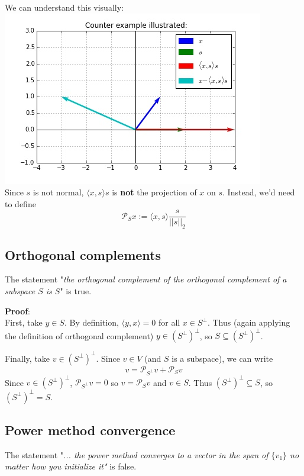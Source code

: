 \documentclass[paper=a4, fontsize=11pt]{scrartcl} %
\numberwithin{equation}{section} %
\numberwithin{figure}{section} %
\numberwithin{table}{section} %
\begin{document}
We can understand this visually:\\
\includegraphics[scale = 1]{q1_a.jpg}\\
Since $s$ is not normal, $\langle x , s \rangle s$ is \textbf{not} the projection of $x$ on $s$. Instead, we'd need to define
\[ \mathcal{P}_S x := \langle x, s \rangle \frac{s}{||s||_2}\]

\subsection{Orthogonal complements}

The statement "\emph{the orthogonal complement of the orthogonal complement of a subspace $S$ is $S$}" is true.

\textbf{Proof}:\\
First, take $y \in S$. By definition, $\langle y, x \rangle = 0$ for all $x \in S^\bot$. Thus (again applying the definition of orthogonal complement) $y \in \left(S^\bot\right)^\bot$, so $S \subseteq \left(S^\bot\right)^\bot$.

Finally, take $v \in \left(S^\bot\right)^\bot$. Since $v \in V$ (and $S$ is a subspace), we can write
\[ v = \mathcal{P}_{S^\bot} v + \mathcal{P}_{S} v \]
Since $v \in \left(S^\bot\right)^\bot$, $\mathcal{P}_{S^\bot} v = 0 $ so $v = \mathcal{P}_{S} v $ and $v \in S$. Thus $\left(S^\bot\right)^\bot \subseteq S$, so $\left(S^\bot\right)^\bot = S$.

\subsection{Power method convergence}

The statement "\emph{... the power method converges to a vector in the span of $\{v_1\}$ no matter how you initialize it"} is false.
\end{document}

